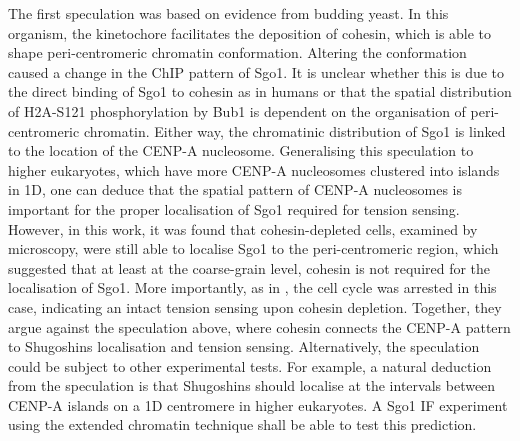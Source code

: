 The first speculation was based on evidence from budding yeast. In this organism, the kinetochore facilitates the deposition of cohesin, which is able to shape peri-centromeric chromatin conformation. Altering the conformation caused a change in the ChIP pattern of Sgo1. It is unclear whether this is due to the direct binding of Sgo1 to cohesin as in humans or that the spatial distribution of H2A-S121 phosphorylation by Bub1 is dependent on the organisation of peri-centromeric chromatin. Either way, the chromatinic distribution of Sgo1 is linked to the location of the CENP-A nucleosome. Generalising this speculation to higher eukaryotes, which have more CENP-A nucleosomes clustered into islands in 1D, one can deduce that the spatial pattern of CENP-A nucleosomes is important for the proper localisation of Sgo1 required for tension sensing. However, in this work, it was found that cohesin-depleted cells, examined by microscopy, were still able to localise Sgo1 to the peri-centromeric region, which suggested that at least at the coarse-grain level, cohesin is not required for the localisation of Sgo1. More importantly, as in \cite{Indjeian2005a}, the cell cycle was arrested in this case, indicating an intact tension sensing upon cohesin depletion. Together, they argue against the speculation above, where cohesin connects the CENP-A pattern to Shugoshins localisation and tension sensing. Alternatively, the speculation could be subject to other experimental tests. For example, a natural deduction from the speculation is that Shugoshins should localise at the intervals between CENP-A islands on a 1D centromere in higher eukaryotes. A Sgo1 IF experiment using the extended chromatin technique shall be able to test this prediction. 




